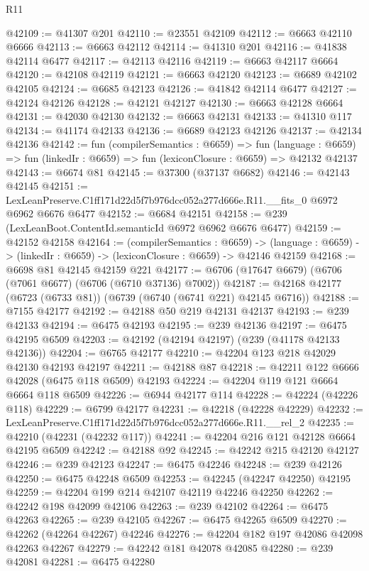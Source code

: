 \begin{lexlean}{R11}
\begin{coremodule}
@42109 := @41307 @201
@42110 := @23551 @42109
@42112 := @6663 @42110 @6666
@42113 := @6663 @42112
@42114 := @41310 @201
@42116 := @41838 @42114 @6477
@42117 := @42113 @42116
@42119 := @6663 @42117 @6664
@42120 := @42108 @42119
@42121 := @6663 @42120
@42123 := @6689 @42102 @42105
@42124 := @6685 @42123
@42126 := @41842 @42114 @6477
@42127 := @42124 @42126
@42128 := @42121 @42127
@42130 := @6663 @42128 @6664
@42131 := @42030 @42130
@42132 := @6663 @42131
@42133 := @41310 @117
@42134 := @41174 @42133
@42136 := @6689 @42123 @42126
@42137 := @42134 @42136
@42142 := fun (compilerSemantics : @6659) =>
  fun (language : @6659) => fun (linkedIr : @6659) => fun (lexiconClosure : @6659) => @42132 @42137
@42143 := @6674 @81
@42145 := @37300 (@37137 @6682)
@42146 := @42143 @42145
@42151 := LexLeanPreserve.C1ff171d22d5f7b976dcc052a277d666e.R11.__fits_0 @6972 @6962 @6676 @6477
@42152 := @6684 @42151
@42158 := @239 (LexLeanBoot.ContentId.semanticId @6972 @6962 @6676 @6477)
@42159 := @42152 @42158
@42164 := (compilerSemantics : @6659) ->
  (language : @6659) -> (linkedIr : @6659) -> (lexiconClosure : @6659) -> @42146 @42159
@42168 := @6698 @81 @42145 @42159 @221
@42177 := @6706 (@17647 @6679) (@6706 (@7061 @6677) (@6706 (@6710 @37136) @7002))
@42187 := @42168 @42177 (@6723 (@6733 @81)) (@6739 (@6740 (@6741 @221) @42145 @6716))
@42188 := @7155 @42177
@42192 := @42188 @50 @219 @42131 @42137
@42193 := @239 @42133
@42194 := @6475 @42193
@42195 := @239 @42136
@42197 := @6475 @42195 @6509
@42203 := @42192 (@42194 @42197) (@239 (@41178 @42133 @42136))
@42204 := @6765 @42177
@42210 := @42204 @123 @218 @42029 @42130 @42193 @42197
@42211 := @42188 @87
@42218 := @42211 @122 @6666 @42028 (@6475 @118 @6509) @42193
@42224 := @42204 @119 @121 @6664 @6664 @118 @6509
@42226 := @6944 @42177 @114
@42228 := @42224 (@42226 @118)
@42229 := @6799 @42177
@42231 := @42218 (@42228 @42229)
@42232 := LexLeanPreserve.C1ff171d22d5f7b976dcc052a277d666e.R11.__rel_2
@42235 := @42210 (@42231 (@42232 @117))
@42241 := @42204 @216 @121 @42128 @6664 @42195 @6509
@42242 := @42188 @92
@42245 := @42242 @215 @42120 @42127
@42246 := @239 @42123
@42247 := @6475 @42246
@42248 := @239 @42126
@42250 := @6475 @42248 @6509
@42253 := @42245 (@42247 @42250) @42195
@42259 := @42204 @199 @214 @42107 @42119 @42246 @42250
@42262 := @42242 @198 @42099 @42106
@42263 := @239 @42102
@42264 := @6475 @42263
@42265 := @239 @42105
@42267 := @6475 @42265 @6509
@42270 := @42262 (@42264 @42267) @42246
@42276 := @42204 @182 @197 @42086 @42098 @42263 @42267
@42279 := @42242 @181 @42078 @42085
@42280 := @239 @42081
@42281 := @6475 @42280

\end{coremodule}
\end{lexlean}
